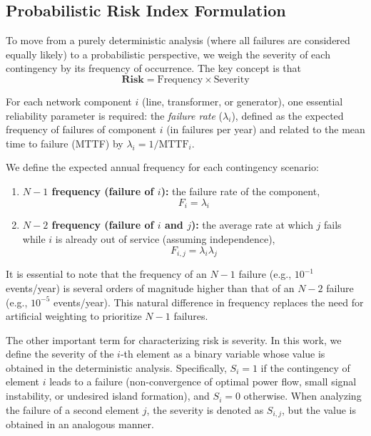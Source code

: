 \documentclass[journal]{IEEEtran}
\begin{document}
\subsection{Probabilistic Risk Index Formulation}

To move from a purely deterministic analysis (where all failures are considered equally likely) to a probabilistic perspective, we weigh the severity of each contingency by its frequency of occurrence. The key concept is that
\[
\textbf{Risk} = \text{Frequency} \times \text{Severity}
\]

For each network component $i$ (line, transformer, or generator), one essential reliability parameter is required: the \textit{failure rate} ($\lambda_i$), defined as the expected frequency of failures of component $i$ (in failures per year) and related to the mean time to failure (MTTF) by $\lambda_i = 1 / \text{MTTF}_i$.


We define the expected annual frequency for each contingency scenario:

\begin{enumerate}
    \item \textbf{$N-1$ frequency (failure of $i$):} the failure rate of the component,
    \begin{equation}
        F_i = \lambda_i
    \end{equation}

    \item \textbf{$N-2$ frequency (failure of $i$ and $j$):} the average rate at which $j$ fails while $i$ is already out of service (assuming independence),
    \begin{equation}
        F_{i,j} = \lambda_i \lambda_j
    \end{equation}
\end{enumerate}

It is essential to note that the frequency of an $N-1$ failure (e.g., $10^{-1}$ events/year) is several orders of magnitude higher than that of an $N-2$ failure (e.g., $10^{-5}$ events/year). This natural difference in frequency replaces the need for artificial weighting to prioritize $N-1$ failures.

The other important term for characterizing risk is severity. In this work, we define the severity of the $i$-th element as a binary variable whose value is obtained in the deterministic analysis. Specifically, $S_i = 1$ if the contingency of element $i$ leads to a failure (non-convergence of optimal power flow, small signal instability, or undesired island formation), and $S_i = 0$ otherwise. When analyzing the failure of a second element $j$, the severity is denoted as $S_{i,j}$, but the value is obtained in an analogous manner.
\end{document}
